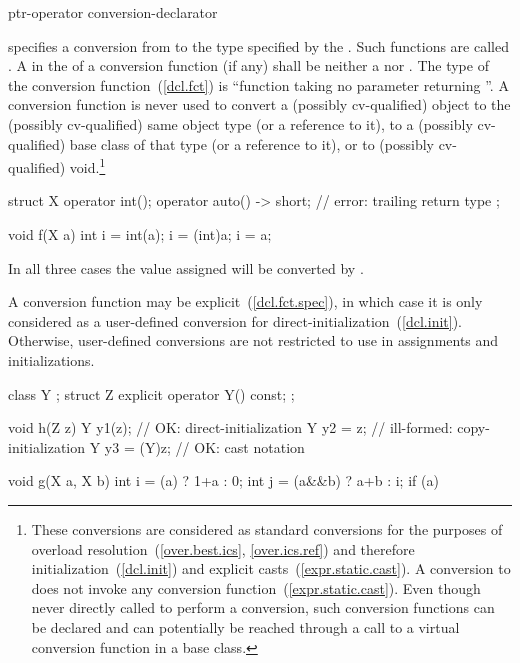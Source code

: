 \begin{bnf}
\br
    ptr-operator conversion-declarator\opt
\end{bnf}

specifies a conversion from
to the type specified by the
.
Such functions are called .
A  in the 
of a conversion function (if any) shall be neither
a  nor .
%
The type of the conversion function~(\ref{dcl.fct}) is
``function taking no parameter returning
''.
A conversion function is never used to convert a (possibly cv-qualified) object
to the (possibly cv-qualified) same object type (or a reference to it),
to a (possibly cv-qualified) base class of that type (or a reference to it),
or to (possibly cv-qualified) void.\footnote{These conversions are considered
as standard conversions for the purposes of overload resolution~(\ref{over.best.ics}, \ref{over.ics.ref}) and therefore initialization~(\ref{dcl.init}) and explicit casts~(\ref{expr.static.cast}). A conversion to  does not invoke any conversion function~(\ref{expr.static.cast}).
Even though never directly called to perform a conversion,
such conversion functions can be declared and can potentially
be reached through a call to a virtual conversion function in a base class.}
\begin{example}
\begin{codeblock}
struct X {
  operator int();
  operator auto() -> short;     // error: trailing return type
};

void f(X a) {
  int i = int(a);
  i = (int)a;
  i = a;
}
\end{codeblock}
In all three cases the value assigned will be converted by
.
\end{example}

\pnum
A conversion function may be explicit~(\ref{dcl.fct.spec}), in which case it is only considered as a user-defined conversion for direct-initialization~(\ref{dcl.init}). Otherwise, user-defined conversions are not restricted to use in assignments and initializations.
\begin{example}
\begin{codeblock}
class Y { };
struct Z {
  explicit operator Y() const;
};

void h(Z z) {
  Y y1(z);          // OK: direct-initialization
  Y y2 = z;         // ill-formed: copy-initialization
  Y y3 = (Y)z;      // OK: cast notation
}

void g(X a, X b) {
  int i = (a) ? 1+a : 0;
  int j = (a&&b) ? a+b : i;
  if (a) {
  }
}
\end{codeblock}
\end{example}

